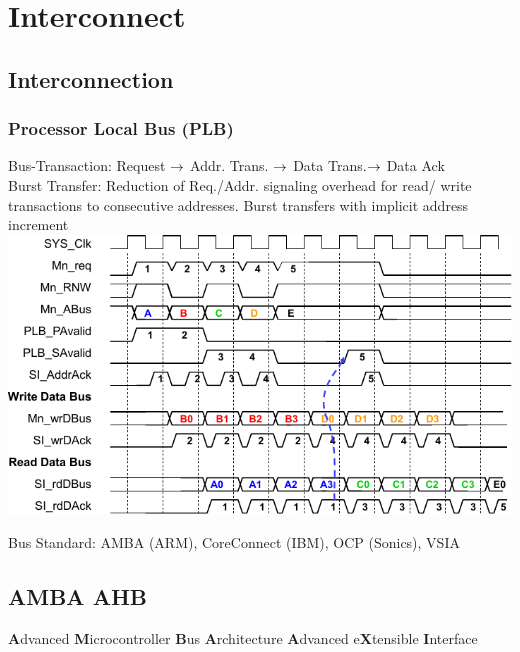 \columnbreak

\section{Interconnect}


\begin{sectionbox}
	\subsection{Interconnection}
	
	\subsubsection{Processor Local Bus (PLB)}
	Bus-Transaction: Request $\rightarrow$ Addr. Trans. $\rightarrow$ Data Trans.$\rightarrow$ Data Ack\\
	Burst Transfer: Reduction of Req./Addr. signaling overhead for read/ write
transactions to consecutive addresses. Burst transfers with implicit address increment\\

	\includegraphics[width = \columnwidth]{./img/interconnect_bus}

\end{sectionbox}


\begin{sectionbox}
	Bus Standard: AMBA (ARM), CoreConnect (IBM), OCP (Sonics), VSIA\\
	\subsection{AMBA AHB}
	\textbf{A}dvanced \textbf{M}icrocontroller \textbf{B}us \textbf{A}rchitecture
	\textbf{A}dvanced e\textbf{X}tensible \textbf{I}nterface
\end{sectionbox}


